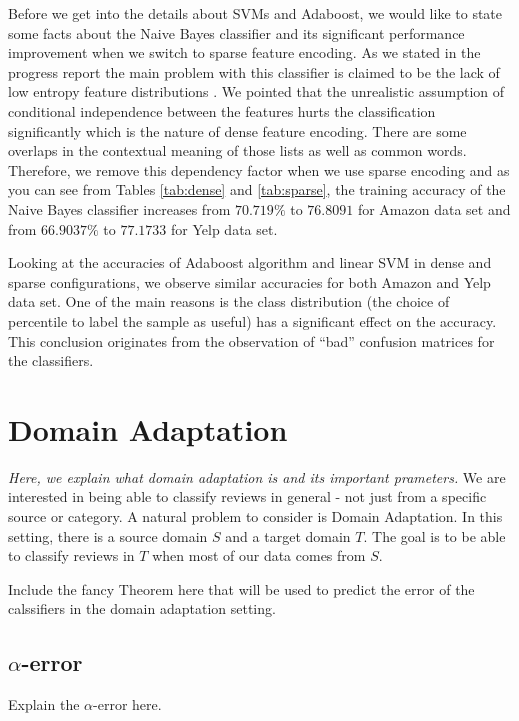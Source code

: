 \documentclass[letterpaper]{article}
\begin{document}
Before we get into the details about SVMs and Adaboost, we would like
to state some facts about the Naive Bayes classifier and its
significant performance improvement when we switch to sparse feature
encoding. As we stated in the progress report the main problem with
this classifier is claimed to be the lack of low entropy feature
distributions \cite{naivebayes}. We pointed that the unrealistic
assumption of conditional independence between the features hurts the classification
significantly which is the nature of dense feature encoding. There are
some overlaps in the contextual meaning of those lists as well as
common words. Therefore, we remove this dependency factor
when we use sparse encoding and as you can see from Tables
\ref{tab:dense} and \ref{tab:sparse}, the training accuracy of
the Naive Bayes classifier increases from $70.719\%$ to $76.8091$ for
Amazon data set and from $66.9037\%$ to $77.1733$ for Yelp data set.  

Looking at the accuracies of Adaboost algorithm and linear SVM in
dense and sparse configurations, we observe similar accuracies for
both Amazon and Yelp data set. One of the main
reasons is the class distribution (the choice of percentile to
label the sample as useful) has a significant
effect on the accuracy. This conclusion originates from the
observation of ``bad'' confusion matrices for the classifiers. 


\section{Domain Adaptation}
\label{sec:background}

\emph{Here, we explain what domain adaptation is and its important
prameters.}
We are interested in being able to classify reviews in general - not
just from a specific source or category. A natural problem to consider
is Domain Adaptation. In this setting, there is a source domain $S$
and a target domain $T$. The goal is to be able to classify reviews in
$T$ when most of our data comes from $S$. 

Include the fancy Theorem here that will be used to predict the error
of the calssifiers in the domain adaptation setting.

\subsection{$\alpha$-error}
\label{sec:alpha-error}

Explain the $\alpha$-error here.
\end{document}
